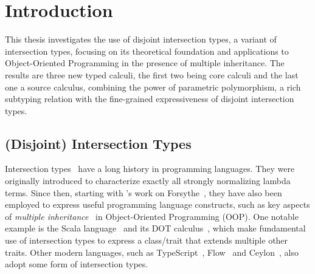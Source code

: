 
\chapter{Introduction}




This thesis investigates the use of disjoint intersection types, a variant of
intersection types, focusing on its theoretical foundation and applications to
Object-Oriented Programming in the presence of multiple inheritance. The results
are three new typed calculi, the first two being core calculi and the last one a
source calculus, combining the power of parametric polymorphism, a rich subtyping
relation with the fine-grained expressiveness of disjoint intersection types.


\section{(Disjoint) Intersection Types}


Intersection types~\citep{pottinger1980type,coppo1981functional} have a long
history in programming languages. They were originally introduced to
characterize exactly all strongly normalizing lambda terms. Since then, starting
with \citeauthor{reynolds1988preliminary}'s work on
Forsythe~\citep{reynolds1988preliminary}, they have also been employed to
express useful programming language constructs, such as key aspects of
\emph{multiple inheritance}~\citep{compagnoni1996higher} in Object-Oriented
Programming (OOP). One notable example is the Scala
language~\citep{odersky2004overview} and its DOT
calculus~\citep{amin2012dependent}, which make fundamental use of intersection
types to express a class/trait that extends multiple other traits. Other modern
languages, such as TypeScript~\citep{typescript}, Flow~\citep{flow} and
Ceylon~\citep{ceylon}, also adopt some form of intersection types.


